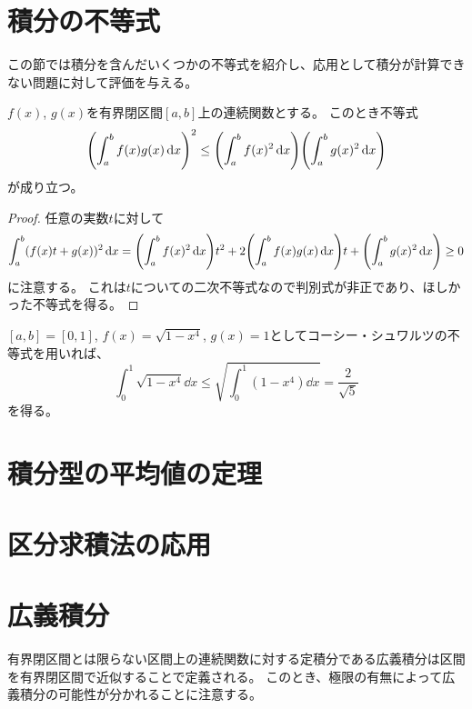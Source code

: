\section{積分の不等式}

この節では積分を含んだいくつかの不等式を紹介し、応用として積分が計算できない問題に対して評価を与える。

\begin{theorem}
$f(x)$, $g(x)$を有界閉区間$[a, b]$上の連続関数とする。
このとき不等式
$$
\qty(\int_a^b f(x)g(x)\dd{x})^2 \le \qty(\int_a^b f(x)^2\dd{x})\qty(\int_a^b g(x)^2\dd{x})
$$
が成り立つ。
\end{theorem}

\begin{proof}
任意の実数$t$に対して
$$
\int_a^b (f(x)t+g(x))^2\dd{x} = \qty(\int_a^b f(x)^2\dd{x})t^2+2\qty(\int_a^b f(x)g(x)\dd{x})t+\qty(\int_a^b g(x)^2\dd{x}) \ge 0
$$
に注意する。
これは$t$についての二次不等式なので判別式が非正であり、ほしかった不等式を得る。
\end{proof}

\begin{example}
$[a, b] = [0, 1]$, $f(x) = \sqrt{1-x^4}$, $g(x) = 1$としてコーシー・シュワルツの不等式を用いれば、
$$
\int_0^1 \sqrt{1-x^4}\dd{x} \le \sqrt{\int_0^1 (1-x^4)\dd{x}} = \frac{2}{\sqrt{5}}
$$
を得る。
\end{example}

\section{積分型の平均値の定理}

\section{区分求積法の応用}

\section{広義積分}

有界閉区間とは限らない区間上の連続関数に対する定積分である広義積分は区間を有界閉区間で近似することで定義される。
このとき、極限の有無によって広義積分の可能性が分かれることに注意する。


